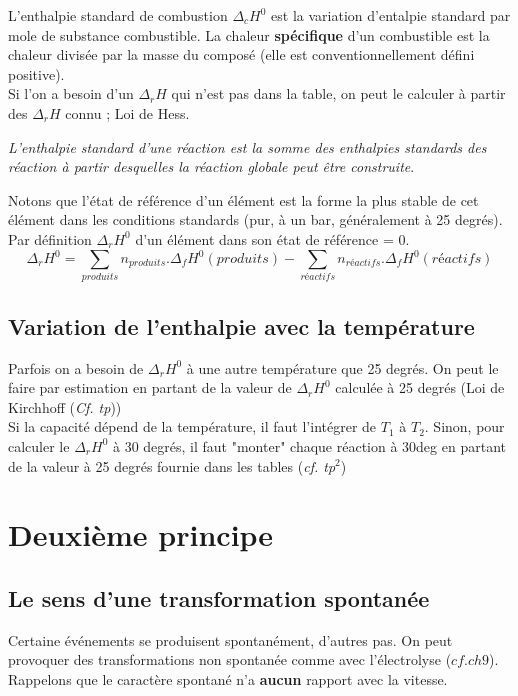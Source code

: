 \documentclass[british,french,11pt, a4paper, openany]{book}
\begin{document}
L'enthalpie standard de combustion $\Delta_c H^0$ est la variation d'entalpie standard par mole de substance combustible.
La chaleur \textbf{spécifique} d'un combustible est la chaleur divisée par la masse du composé (elle est conventionnellement défini positive).\\

Si l'on a besoin d'un $\Delta_r H$ qui n'est pas dans la table, on peut le calculer à partir des $\Delta_r H$ connu ; Loi de Hess.
\begin{center}
	\textit{L'enthalpie standard d'une réaction est la somme des enthalpies standards des réaction à partir desquelles la réaction globale peut être construite}.
\end{center}
Notons que l'état de référence d'un élément est la forme la plus stable de cet élément dans les conditions standards (pur, à un bar, généralement à 25 degrés).\\
Par définition $\Delta_r H^0$ d'un élément dans son état de référence = 0.
$$\Delta_r H^0 = \sum_{produits} n_{produits}.\Delta_f H^0(produits) - \sum_{réactifs} n_{réactifs}.\Delta_f H^0(réactifs)$$

\subsection{Variation de l'enthalpie avec la température}
Parfois on a besoin de $\Delta_r H^0$ à une autre température que 25 degrés. On peut le faire par estimation en partant de la valeur de $\Delta_r H^0$ calculée à 25 degrés (Loi de Kirchhoff (\textit{Cf. tp}))\\
Si la capacité dépend de la température, il faut l'intégrer de $T_1$ à $T_2$. Sinon, pour calculer le $\Delta_r H^0$ à 30 degrés, il faut "monter" chaque réaction à 30deg en partant de la valeur à 25 degrés fournie dans les tables (\textit{cf. tp}$^2$)

\section{Deuxième principe}
\subsection{Le sens d'une transformation spontanée}
Certaine événements se produisent spontanément, d'autres pas. On peut provoquer des transformations non spontanée comme avec l'électrolyse ($cf. ch9$). Rappelons que le caractère spontané n'a \textbf{aucun} rapport avec la vitesse.\\
\end{document}
